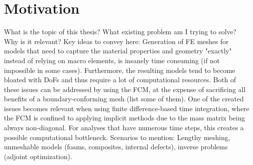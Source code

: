 %
\section{Motivation}
\label{section:motivation}
%
What is the topic of this thesis? What existing problem am I trying to solve? Why is it relevant?
Key ideas to convey here:
Generation of FE meshes for models that need to capture the material properties and geometry "exactly" instead of relying on macro elements, is insanely time consuming (if not impossible in some cases). Furthermore, the resulting models tend to become bloated with DoFs and thus require a lot of computational resources. Both of these issues can be addressed by using the FCM, at the expense of sacrificing all benefits of a boundary-conforming mesh (list some of them). One of the created issues becomes relevant when using finite difference-based time integration, where the FCM is confined to applying implicit methods due to the mass matrix being always non-diagonal. For analyses that have numerous time steps, this creates a possible computational bottleneck.
Scenarios to mention:
Lengthy meshing, unmeshable models (foams, composites, internal defects),
inverse problems (adjoint optimization).
